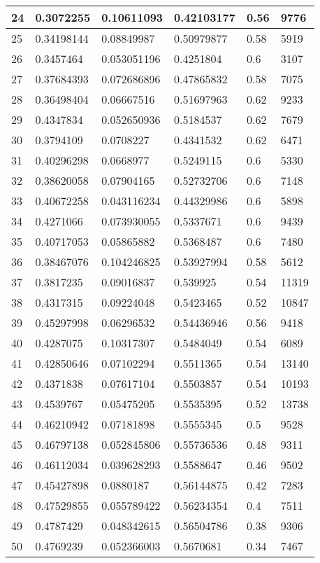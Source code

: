 \begin{longtable}{|l|l|l|l|l|l|}
24 & 0.3072255 & 0.10611093 & 0.42103177 & 0.56 & 9776 \\ \hline 
25 & 0.34198144 & 0.08849987 & 0.50979877 & 0.58 & 5919 \\ \hline 
26 & 0.3457464 & 0.053051196 & 0.4251804 & 0.6 & 3107 \\ \hline 
27 & 0.37684393 & 0.072686896 & 0.47865832 & 0.58 & 7075 \\ \hline 
28 & 0.36498404 & 0.06667516 & 0.51697963 & 0.62 & 9233 \\ \hline 
29 & 0.4347834 & 0.052650936 & 0.5184537 & 0.62 & 7679 \\ \hline 
30 & 0.3794109 & 0.0708227 & 0.4341532 & 0.62 & 6471 \\ \hline 
31 & 0.40296298 & 0.0668977 & 0.5249115 & 0.6 & 5330 \\ \hline 
32 & 0.38620058 & 0.07904165 & 0.52732706 & 0.6 & 7148 \\ \hline 
33 & 0.40672258 & 0.043116234 & 0.44329986 & 0.6 & 5898 \\ \hline 
34 & 0.4271066 & 0.073930055 & 0.5337671 & 0.6 & 9439 \\ \hline 
35 & 0.40717053 & 0.05865882 & 0.5368487 & 0.6 & 7480 \\ \hline 
36 & 0.38467076 & 0.104246825 & 0.53927994 & 0.58 & 5612 \\ \hline 
37 & 0.3817235 & 0.09016837 & 0.539925 & 0.54 & 11319 \\ \hline 
38 & 0.4317315 & 0.09224048 & 0.5423465 & 0.52 & 10847 \\ \hline 
39 & 0.45297998 & 0.06296532 & 0.54436946 & 0.56 & 9418 \\ \hline 
40 & 0.4287075 & 0.10317307 & 0.5484049 & 0.54 & 6089 \\ \hline 
41 & 0.42850646 & 0.07102294 & 0.5511365 & 0.54 & 13140 \\ \hline 
42 & 0.4371838 & 0.07617104 & 0.5503857 & 0.54 & 10193 \\ \hline 
43 & 0.4539767 & 0.05475205 & 0.5535395 & 0.52 & 13738 \\ \hline 
44 & 0.46210942 & 0.07181898 & 0.5555345 & 0.5 & 9528 \\ \hline 
45 & 0.46797138 & 0.052845806 & 0.55736536 & 0.48 & 9311 \\ \hline 
46 & 0.46112034 & 0.039628293 & 0.5588647 & 0.46 & 9502 \\ \hline 
47 & 0.45427898 & 0.0880187 & 0.56144875 & 0.42 & 7283 \\ \hline 
48 & 0.47529855 & 0.055789422 & 0.56234354 & 0.4 & 7511 \\ \hline 
49 & 0.4787429 & 0.048342615 & 0.56504786 & 0.38 & 9306 \\ \hline 
50 & 0.4769239 & 0.052366003 & 0.5670681 & 0.34 & 7467 \\ \hline 
\end{longtable}